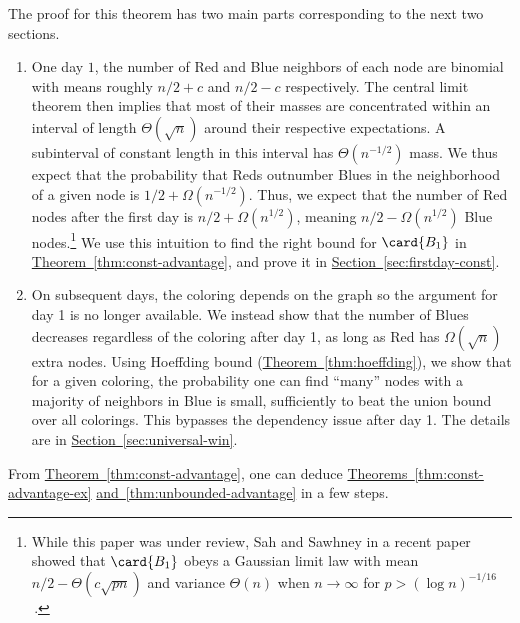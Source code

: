 \documentclass[11pt]{article}
\numberwithin{equation}{section}
\theoremstyle{definition}
\theoremstyle{plain}
\newcommand{\expref}[2]{\hyperref[#2]{#1~\ref{#2}}}
\begin{document}
			The proof for this theorem has two main parts corresponding to the next two sections.
			\begin{enumerate}
				\item One day $1$, the number of Red and Blue neighbors of each node are binomial with means roughly 
				$n/2 + c$ and $n/2 - c$ respectively.
				The central limit theorem then implies that most of their masses are concentrated within an interval of length
				$\Theta (\sqrt n)$ around their respective expectations.
				A subinterval of constant length in this interval has $\Theta (n^{-1/2})$ mass.
				We thus expect that the probability that Reds outnumber Blues in 
				the neighborhood of a given node %
				is %
				$1/2 + \Omega (n^{-1/2})$. Thus, we expect that the number of Red nodes after the first day is $n/2 + \Omega (n^{1/2})$, meaning $n/2 - \Omega (n^{1/2})$ Blue nodes.\footnote[1]{While this paper was under review, Sah and Sawhney in a recent paper \cite{sahsawhney2021} showed that $\card{B_1}$ obeys a Gaussian limit law with mean $n/2 - \Theta(c\sqrt{pn})$ and variance $\Theta(n)$ when $n\to \infty$ for $p > (\log n)^{-1/16}$\,.}
				We use this intuition to find the right bound for $\card{B_1}$ in \expref{Theorem}{thm:const-advantage}, and prove it in \expref{Section}{sec:firstday-const}.
				
				\item On subsequent days, the coloring depends on the graph so the argument for day 1 is no longer available.
				We instead show that the number of Blues decreases %
				regardless of the coloring after day 1, as long as Red has $\Omega(\sqrt{n})$ extra nodes.
				Using Hoeffding bound (\expref{Theorem}{thm:hoeffding}), we show that for a given coloring, the probability one can find ``many'' nodes with a majority of neighbors in Blue is small, %
				sufficiently  %
				to beat the union bound over all colorings.
				This bypasses the dependency issue after day 1.
				The details are in \expref{Section}{sec:universal-win}.
			\end{enumerate}
			
			From \expref{Theorem}{thm:const-advantage}, one can deduce \expref{Theorems}{thm:const-advantage-ex} \expref{and}{thm:unbounded-advantage} in a few steps.
			
\end{document}
